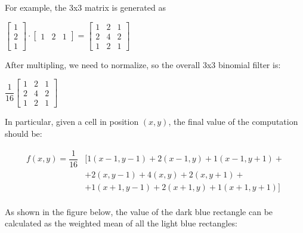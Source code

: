  For example, the 3x3 matrix is generated as 
   \begin{center}
   	$ \begin{bmatrix}1\\ 2 \\ 1 \end{bmatrix} \cdot
   	\begin{bmatrix} 1 & 2 & 1 \end{bmatrix}= \begin{bmatrix}1 & 2 & 1\\
   	2 & 4 & 2   	\\1 & 2 & 1\end{bmatrix}$
   \end{center}
      After multipling, we need to normalize, so the overall 3x3 binomial filter is:
   \begin{center}
   	$   \dfrac{1}{16}\begin{bmatrix}1 & 2 & 1\\
   	2 & 4 & 2   	\\1 & 2 & 1\end{bmatrix}$
   \end{center}
    In particular, given a cell in position $ (x, y) $, the final value of the computation should be:
   
     \begin{equation} \label{eq:BN eq}
     \begin{aligned}
     f(x,y)= \dfrac{1}{16} & [  1(x-1,y-1) + 2(x-1,y)+ 1(x-1, y+1)+\\
     & + 2(x,y-1) + 4(x,y)+ 2(x, y+1)+\\
     & + 1(x+1,y-1) + 2(x+1,y) + 1(x+1, y + 1) ] \\
     \end{aligned}
     \end{equation}
     
     As shown in the figure below, the value of the dark blue rectangle can be calculated as the weighted mean of all the light blue rectangles:
       
